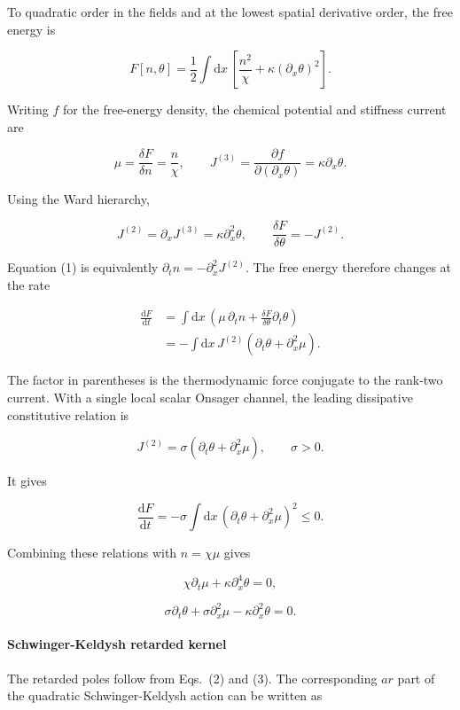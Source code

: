 To quadratic order in the fields and at the lowest spatial derivative order,
the free energy is

\[
F[n,\theta]
=\frac12\int\mathrm{d}x\,
\left[
\frac{n^2}{\chi}
+\kappa(\partial_x\theta)^2
\right].
\]

Writing $f$ for the free-energy density, the chemical potential and
stiffness current are

\[
\mu=\frac{\delta F}{\delta n}=\frac{n}{\chi},
\qquad
J^{(3)}
=\frac{\partial f}{\partial(\partial_x\theta)}
=\kappa\partial_x\theta.
\]

Using the Ward hierarchy,

\[
J^{(2)}=\partial_x J^{(3)}=\kappa\partial_x^2\theta,
\qquad
\frac{\delta F}{\delta\theta}=-J^{(2)}.
\]

Equation (1) is equivalently
$\partial_t n=-\partial_x^2J^{(2)}$. The free energy therefore changes at the
rate

\[
\begin{aligned}
\frac{\mathrm{d}F}{\mathrm{d}t}
&=\int\mathrm{d}x\,
\left(
\mu\,\partial_t n
+\frac{\delta F}{\delta\theta}\partial_t\theta
\right)\\
&=-\int\mathrm{d}x\,J^{(2)}
\left(\partial_t\theta+\partial_x^2\mu\right).
\end{aligned}
\]

The factor in parentheses is the thermodynamic force conjugate to the
rank-two current. With a single local scalar Onsager channel, the leading
dissipative constitutive relation is

\[
J^{(2)}
=\sigma\left(\partial_t\theta+\partial_x^2\mu\right),
\qquad \sigma>0.
\]

It gives

\[
\frac{\mathrm{d}F}{\mathrm{d}t}
=-\sigma\int\mathrm{d}x\,
\left(\partial_t\theta+\partial_x^2\mu\right)^2
\leq0.
\]

Combining these relations with $n=\chi\mu$ gives

\[
\chi\partial_t\mu+\kappa\partial_x^4\theta=0,
\tag{2}
\]

\[
\sigma\partial_t\theta
+\sigma\partial_x^2\mu
-\kappa\partial_x^2\theta=0.
\tag{3}
\]

\paragraph*{Schwinger-Keldysh retarded kernel}

The retarded poles follow from Eqs.~(2) and (3). The corresponding $ar$ part
of the quadratic Schwinger-Keldysh action can be written as

